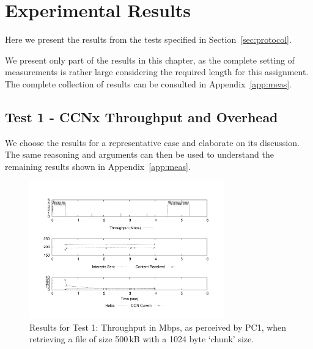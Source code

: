 \chapter{Experimental Results}

Here we present the results from the tests specified in 
Section~\ref{sec:protocol}.\vertbreak

We present only part of the results in this chapter, as the complete 
setting of measurements is rather large considering the required 
length for this assignment. The complete 
collection of results can be consulted in Appendix~\ref{app:meas}.

\section{Test 1 - CCNx Throughput and Overhead}
\label{sec:res-throughput-overhead}

We choose the results for a representative case and elaborate on its 
discussion. The same reasoning and arguments can then be used to understand 
the remaining results shown in Appendix~\ref{app:meas}.

\begin{figure}[h!]

    \centering
    \includegraphics[width=0.75\textwidth]{figures/udp_0_5_1024.pdf}
    \cprotect\caption{Results for Test 1: Throughput in Mbps, as perceived by 
        PC1, when retrieving a file of size 500\,kB with a 1024 byte 
        `chunk' size.}
    \label{fig:test-1-thpt-0_5-1024}

\end{figure}

